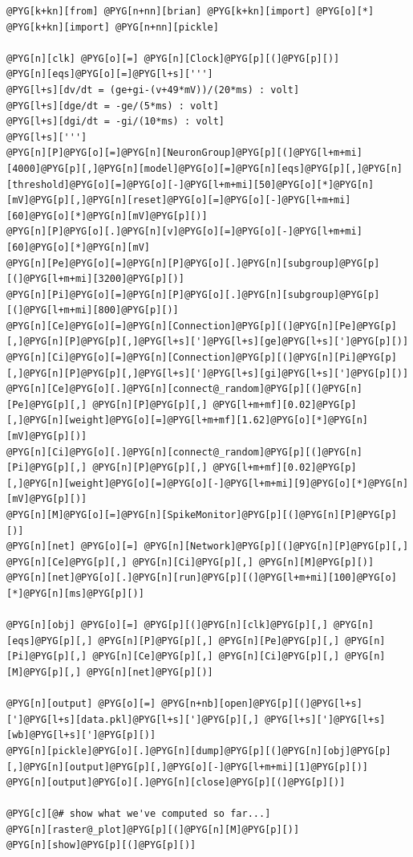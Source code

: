 \documentclass[letterpaper,10pt,english]{manual}
\begin{document}
\begin{Verbatim}[commandchars=@\[\]]
@PYG[k+kn][from] @PYG[n+nn][brian] @PYG[k+kn][import] @PYG[o][*]
@PYG[k+kn][import] @PYG[n+nn][pickle]

@PYG[n][clk] @PYG[o][=] @PYG[n][Clock]@PYG[p][(]@PYG[p][)]
@PYG[n][eqs]@PYG[o][=]@PYG[l+s][''']
@PYG[l+s][dv/dt = (ge+gi-(v+49*mV))/(20*ms) : volt]
@PYG[l+s][dge/dt = -ge/(5*ms) : volt]
@PYG[l+s][dgi/dt = -gi/(10*ms) : volt]
@PYG[l+s][''']
@PYG[n][P]@PYG[o][=]@PYG[n][NeuronGroup]@PYG[p][(]@PYG[l+m+mi][4000]@PYG[p][,]@PYG[n][model]@PYG[o][=]@PYG[n][eqs]@PYG[p][,]@PYG[n][threshold]@PYG[o][=]@PYG[o][-]@PYG[l+m+mi][50]@PYG[o][*]@PYG[n][mV]@PYG[p][,]@PYG[n][reset]@PYG[o][=]@PYG[o][-]@PYG[l+m+mi][60]@PYG[o][*]@PYG[n][mV]@PYG[p][)]
@PYG[n][P]@PYG[o][.]@PYG[n][v]@PYG[o][=]@PYG[o][-]@PYG[l+m+mi][60]@PYG[o][*]@PYG[n][mV]
@PYG[n][Pe]@PYG[o][=]@PYG[n][P]@PYG[o][.]@PYG[n][subgroup]@PYG[p][(]@PYG[l+m+mi][3200]@PYG[p][)]
@PYG[n][Pi]@PYG[o][=]@PYG[n][P]@PYG[o][.]@PYG[n][subgroup]@PYG[p][(]@PYG[l+m+mi][800]@PYG[p][)]
@PYG[n][Ce]@PYG[o][=]@PYG[n][Connection]@PYG[p][(]@PYG[n][Pe]@PYG[p][,]@PYG[n][P]@PYG[p][,]@PYG[l+s][']@PYG[l+s][ge]@PYG[l+s][']@PYG[p][)]
@PYG[n][Ci]@PYG[o][=]@PYG[n][Connection]@PYG[p][(]@PYG[n][Pi]@PYG[p][,]@PYG[n][P]@PYG[p][,]@PYG[l+s][']@PYG[l+s][gi]@PYG[l+s][']@PYG[p][)]
@PYG[n][Ce]@PYG[o][.]@PYG[n][connect@_random]@PYG[p][(]@PYG[n][Pe]@PYG[p][,] @PYG[n][P]@PYG[p][,] @PYG[l+m+mf][0.02]@PYG[p][,]@PYG[n][weight]@PYG[o][=]@PYG[l+m+mf][1.62]@PYG[o][*]@PYG[n][mV]@PYG[p][)]
@PYG[n][Ci]@PYG[o][.]@PYG[n][connect@_random]@PYG[p][(]@PYG[n][Pi]@PYG[p][,] @PYG[n][P]@PYG[p][,] @PYG[l+m+mf][0.02]@PYG[p][,]@PYG[n][weight]@PYG[o][=]@PYG[o][-]@PYG[l+m+mi][9]@PYG[o][*]@PYG[n][mV]@PYG[p][)]
@PYG[n][M]@PYG[o][=]@PYG[n][SpikeMonitor]@PYG[p][(]@PYG[n][P]@PYG[p][)]
@PYG[n][net] @PYG[o][=] @PYG[n][Network]@PYG[p][(]@PYG[n][P]@PYG[p][,] @PYG[n][Ce]@PYG[p][,] @PYG[n][Ci]@PYG[p][,] @PYG[n][M]@PYG[p][)]
@PYG[n][net]@PYG[o][.]@PYG[n][run]@PYG[p][(]@PYG[l+m+mi][100]@PYG[o][*]@PYG[n][ms]@PYG[p][)]

@PYG[n][obj] @PYG[o][=] @PYG[p][(]@PYG[n][clk]@PYG[p][,] @PYG[n][eqs]@PYG[p][,] @PYG[n][P]@PYG[p][,] @PYG[n][Pe]@PYG[p][,] @PYG[n][Pi]@PYG[p][,] @PYG[n][Ce]@PYG[p][,] @PYG[n][Ci]@PYG[p][,] @PYG[n][M]@PYG[p][,] @PYG[n][net]@PYG[p][)]

@PYG[n][output] @PYG[o][=] @PYG[n+nb][open]@PYG[p][(]@PYG[l+s][']@PYG[l+s][data.pkl]@PYG[l+s][']@PYG[p][,] @PYG[l+s][']@PYG[l+s][wb]@PYG[l+s][']@PYG[p][)]
@PYG[n][pickle]@PYG[o][.]@PYG[n][dump]@PYG[p][(]@PYG[n][obj]@PYG[p][,]@PYG[n][output]@PYG[p][,]@PYG[o][-]@PYG[l+m+mi][1]@PYG[p][)]
@PYG[n][output]@PYG[o][.]@PYG[n][close]@PYG[p][(]@PYG[p][)]

@PYG[c][@# show what we've computed so far...]
@PYG[n][raster@_plot]@PYG[p][(]@PYG[n][M]@PYG[p][)]
@PYG[n][show]@PYG[p][(]@PYG[p][)]
\end{Verbatim}
\end{document}
